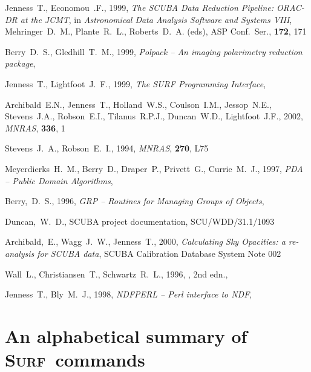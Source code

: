 \documentclass[twoside,11pt]{starlink}
\providecommand{\scusoft}          {\textsc{Surf}}
\begin{document}
\begin{thebibliography}{}
Jenness~T., Economou~.F., 1999, \textit{The SCUBA Data Reduction Pipeline:
ORAC-DR at the JCMT}, in \textit{Astronomical Data Analysis Software and
Systems VIII}, Mehringer~D.~M., Plante~R.~L., Roberts~D.~A. (eds),
ASP Conf.\ Ser., \textbf{172}, 171


Berry~D.~S., Gledhill~T.~M., 1999,
\textit{Polpack -- An imaging polarimetry reduction package},

Jenness~T., Lightfoot~J.~F., 1999, \textit{The SURF Programming Interface},

Archibald~E.N., Jenness~T., Holland~W.S., Coulson~I.M., Jessop~N.E.,
Stevens~J.A., Robson~E.I., Tilanus~R.P.J., Duncan~W.D., Lightfoot~J.F., 2002,
\textit{MNRAS}, \textbf{336}, 1


Stevens~J.~A.,  Robson~E.~I.,  1994, \textit{ MNRAS}, \textbf{270}, L75


Meyerdierks~H.~M., Berry~D., Draper~P., Privett~G., Currie~M.~J., 1997,
\textit{PDA -- Public Domain Algorithms},

Berry,~D.~S., 1996,
\textit{GRP -- Routines for Managing Groups of Objects},

Duncan,~W.~D., SCUBA project documentation, SCU/WDD/31.1/1093

Archibald,~E., Wagg~J.~W., Jenness~T., 2000,
\textit{Calculating Sky Opacities: a re-analysis for SCUBA data},
SCUBA Calibration Database System Note 002

Wall~L., Christiansen~T., Schwartz~R.~L., 1996,
, 2nd
edn., 

Jenness~T., Bly~M.~J., 1998,
\textit{NDFPERL -- Perl interface to NDF},

\end{thebibliography}


\appendix

\clearpage

\section{An alphabetical summary of \scusoft\ commands\label{alphabet}}
\end{document}
